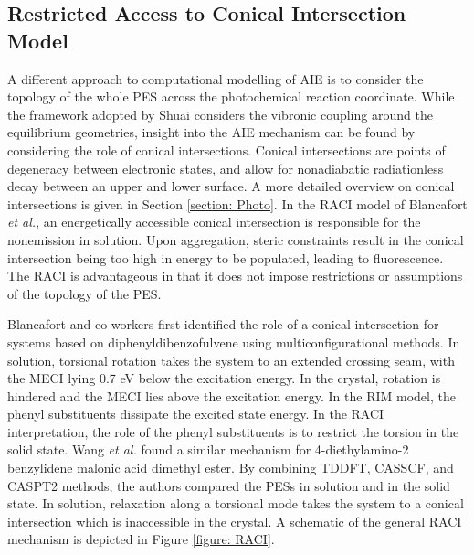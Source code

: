 \subsection{Restricted Access to Conical Intersection Model}\label{section: lom RACI}
A different approach to computational modelling of AIE is to consider the topology of the whole \ac{PES} across the photochemical reaction coordinate. While the framework adopted by Shuai considers the vibronic coupling around the equilibrium geometries, insight into the AIE mechanism can be found by considering the role of conical intersections. Conical intersections are points of degeneracy between electronic states, and allow for nonadiabatic radiationless decay between an upper and lower surface. A more detailed overview on conical intersections is given in Section \ref{section: Photo}. In the \ac{RACI} model of Blancafort \textit{et al.}, an energetically accessible conical intersection is responsible for the nonemission in solution. Upon aggregation, steric constraints result in the conical intersection being too high in energy to be populated, leading to fluorescence.\cite{Peng2016} The \ac{RACI} is advantageous in that it does not impose restrictions or assumptions of the topology of the \ac{PES}.  

Blancafort and co-workers first identified the role of a conical intersection for systems based on diphenyldibenzofulvene using multiconfigurational methods.\cite{Li2013} In solution, torsional rotation takes the system to an extended crossing seam, with the \ac{MECI} lying 0.7 eV below the excitation energy. In the crystal, rotation is hindered and the \ac{MECI} lies above the excitation energy. In the RIM model, the phenyl substituents dissipate the excited state energy. In the RACI interpretation, the role of the phenyl substituents is to restrict the torsion in the solid state. Wang \textit{et al.} found a similar mechanism for 4-diethylamino-2 benzylidene malonic acid dimethyl ester. \cite{Wang2016} By combining TDDFT, CASSCF, and CASPT2 methods, the authors compared the \acp{PES} in solution and in the solid state. In solution, relaxation along a torsional mode takes the system to a conical intersection which is inaccessible in the crystal. A schematic of the general \ac{RACI} mechanism is depicted in Figure \ref{figure: RACI}.

